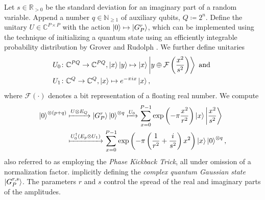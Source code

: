 \documentclass[10pt]{amsart}
\theoremstyle{definition}
\theoremstyle{remark}
\begin{document}
    Let \(s \in \mathbb{R}_{> 0}\) be the standard deviation for an imaginary part of a random variable. Append a number \(q \in \mathbb{N}_{\geq 1}\) of auxiliary qubits, \(Q \coloneqq 2^n\). Define the unitary \(U \in \mathbb{C}^{P \times P}\) with the action \(\ket{0} \mapsto \ket{G_P^r}\), which can be implemented using the technique of initializing a quantum state using an efficiently integrable probability distribution by Grover and Rudolph \cite{Grover}. We further define unitaries
    \begin{align}
        &U_0\colon \mathbb{C}^{PQ} \to \mathbb{C}^{PQ}, \ket{x}\ket{y} \mapsto \ket{x}\ket{y \oplus \mathcal{F}\left(\frac{x^2}{s^2}\right)} \text{ and }\\
        &U_1\colon \mathbb{C}^{Q} \to \mathbb{C}^{Q}, \ket{x} \mapsto e^{-\pi i x}\ket{x},
    \end{align}
    where \(\mathcal{F}(\cdot)\) denotes a bit representation of a floating real number. We compute
    \begin{align}
        \ket{0}^{\otimes (p+q)} &\xmapsto{U \otimes E_Q} \ket{G_P^r}\ket{0}^{\otimes q} \xmapsto{U_0} \sum_{x=0}^{P-1} \exp\left(-\pi\frac{x^2}{r^2}\right) \ket{x}\ket{\frac{x^2}{s^2}}\\
        &\xmapsto{U_0^\dagger(E_p \otimes U_1)} \sum_{x=0}^{P-1} \exp\left(-\pi\left(\frac{1}{r^2}+\frac{i}{s^2}\right)x^2\right) \ket{x}\ket{0}^{\otimes q},
    \end{align}
    also referred to as employing the \emph{Phase Kickback Trick}, all under omission of a normalization factor. implicitly defining the \emph{complex quantum Gaussian state} \(\ket{G_P^{r, s}}\). The parameters \(r\) and \(s\) control the spread of the real and imaginary parts of the amplitudes.

    \phantom{}
\end{document}
